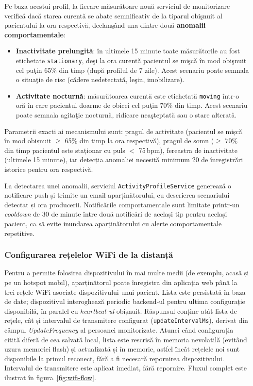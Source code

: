 \documentclass[12pt,a4paper,twoside]{article}
\begin{document}
Pe baza acestui profil, la fiecare măsurătoare nouă serviciul de monitorizare verifică dacă starea curentă se abate semnificativ de la tiparul obişnuit al pacientului la ora respectivă, declanşând una dintre două \textbf{anomalii comportamentale}:

\begin{itemize}[leftmargin=1.5em]
\item \textbf{Inactivitate prelungită}: în ultimele 15 minute toate măsurătorile au fost etichetate \texttt{stationary}, deşi la ora curentă pacientul se mişcă în mod obişnuit cel puţin 65\% din timp (după profilul de 7 zile). Acest scenariu poate semnala o situaţie de risc (cădere nedetectată, leşin, imobilizare).
\item \textbf{Activitate nocturnă}: măsurătoarea curentă este etichetată \texttt{moving} într-o oră în care pacientul doarme de obicei cel puţin 70\% din timp. Acest scenariu poate semnala agitaţie nocturnă, ridicare neaşteptată sau o stare alterată.
\end{itemize}

Parametrii exacti ai mecanismului sunt: pragul de activitate (pacientul se mișcă în mod obișnuit $\geq$ 65\% din timp la ora respectivă), pragul de somn ($\geq$ 70\% din timp pacientul este staționar cu puls $<$ 75\,bpm), fereastra de inactivitate (ultimele 15 minute), iar detecția anomaliei necesită minimum 20 de înregistrări istorice pentru ora respectivă.

La detectarea unei anomalii, serviciul \texttt{ActivityProfileService} generează o notificare push și trimite un email aparținătorului, cu descrierea scenariului detectat și ora producerii. Notificările comportamentale sunt limitate printr-un \textit{cooldown} de 30 de minute între două notificări de același tip pentru același pacient, ca să evite inundarea aparținătorului cu alerte comportamentale repetitive.

\subsubsection{Configurarea rețelelor WiFi de la distanță}

Pentru a permite folosirea dispozitivului în mai multe medii (de exemplu, acasă și pe un hotspot mobil), aparținătorul poate înregistra din aplicația web până la trei rețele WiFi asociate dispozitivului unui pacient. Lista este persistată în baza de date; dispozitivul interoghează periodic backend-ul pentru ultima configurație disponibilă, în paralel cu \textit{heartbeat-ul} obișnuit. Răspunsul conține atât lista de rețele, cât și intervalul de transmitere configurat (\texttt{updateIntervalMs}), derivat din câmpul \textit{UpdateFrequency} al persoanei monitorizate. Atunci când configurația citită diferă de cea salvată local, lista este rescrisă în memoria nevolatilă (evitând uzura memoriei flash) și actualizată și în memorie, astfel încât rețelele noi sunt disponibile la primul reconect, fără a fi necesară repornirea dispozitivului. Intervalul de transmitere este aplicat imediat, fără repornire. Fluxul complet este ilustrat în figura~\ref{fig:wifi-flow}.
\end{document}
